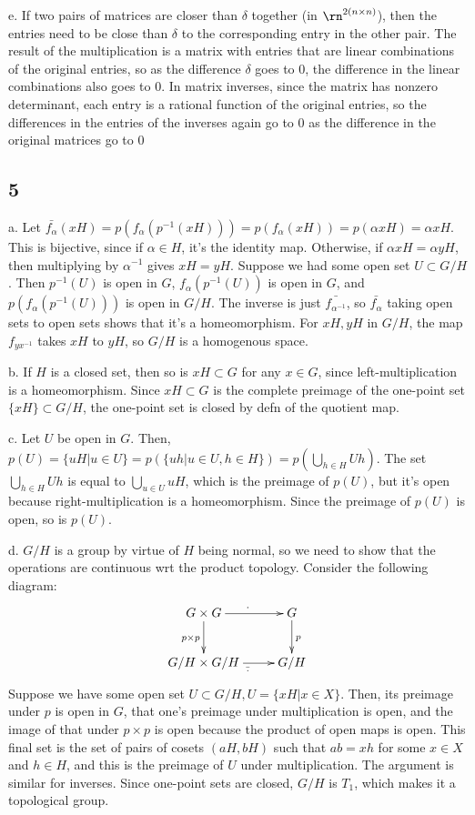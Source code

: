 \documentclass{article}
\begin{document}
e. If two pairs of matrices are closer than $\delta$ together (in $\rn^{2(n\times n)}$), then the entries need to be close than $\delta$ to the corresponding entry in the other pair. The result of the multiplication is a matrix with entries that are linear combinations of the original entries, so as the difference $\delta$ goes to $0$, the difference in the linear combinations also goes to $0$. In matrix inverses, since the matrix has nonzero determinant, each entry is a rational function of the original entries, so the differences in the entries of the inverses again go to $0$ as the difference in the original matrices go to $0$
\subsection*{5}
a. Let $\bar{f_\alpha}(xH)=p(f_\alpha(p^{-1}(xH)))=p(f_\alpha(xH))=p(\alpha xH)=\alpha xH$. This is bijective, since if $\alpha\in H$, it's the identity map. Otherwise, if $\alpha xH=\alpha yH$, then multiplying by $\alpha^{-1}$ gives $xH=yH$. Suppose we had some open set $U\subset G/H$. Then $p^{-1}(U)$ is open in $G$, $f_\alpha(p^{-1}(U))$ is open in $G$, and $p(f_\alpha(p^{-1}(U)))$ is open in $G/H$. The inverse is just $\bar{f_{\alpha^{-1}}}$, so $\bar{f_\alpha}$ taking open sets to open sets shows that it's a homeomorphism. For $xH,yH$ in $G/H$, the map $f_{yx^{-1}}$ takes $xH$ to $yH$, so $G/H$ is a homogenous space.

b. If $H$ is a closed set, then so is $xH\subset G$ for any $x\in G$, since left-multiplication is a homeomorphism. Since $xH\subset G$ is the complete preimage of the one-point set $\{xH\}\subset G/H$, the one-point set is closed by defn of the quotient map.

c. Let $U$ be open in $G$. Then, $p(U)=\{uH|u\in U\}=p(\{uh|u\in U,h\in H\})=p(\bigcup_{h\in H} Uh)$. The set $\bigcup_{h\in H} Uh$ is equal to $\bigcup_{u\in U} uH$, which is the preimage of $p(U)$, but it's open because right-multiplication is a homeomorphism. Since the preimage of $p(U)$ is open, so is $p(U)$.

d. $G/H$ is a group by virtue of $H$ being normal, so we need to show that the operations are continuous wrt the product topology. Consider the following diagram:
\begin{equation*}
\xymatrix{
    G\times G \ar[r]^\cdot \ar[d]_{p\times p}& G \ar[d]^p\\
    G/H\times G/H \ar[r]_{\bar{\cdot}} & G/H
}
\end{equation*}
Suppose we have some open set $U\subset G/H,U=\{xH|x\in X\}$. Then, its preimage under $p$ is open in $G$, that one's preimage under multiplication is open, and the image of that under $p\times p$ is open because the product of open maps is open. This final set is the set of pairs of cosets $(aH,bH)$ such that $ab=xh$ for some $x\in X$ and $h\in H$, and this is the preimage of $U$ under multiplication. The argument is similar for inverses. Since one-point sets are closed, $G/H$ is $T_1$, which makes it a topological group.
\end{document}
